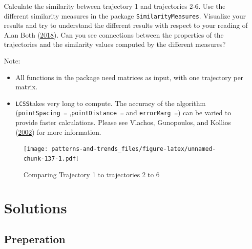 \documentclass[]{book}
\providecommand{\tightlist}{%
  \setlength{\itemsep}{0pt}\setlength{\parskip}{0pt}}
\begin{document}
Calculate the similarity between trajectory 1 and trajectories 2-6. Use
the different similarity measures in the package
\texttt{SimilarityMeasures}. Visualize your results and try to
understand the different results with respect to your reading of Alan
Both (\protect\hyperlink{ref-both2018}{2018}). Can you see connections
between the properties of the trajectories and the similarity values
computed by the different measures?

Note:

\begin{itemize}
\tightlist
\item
  All functions in the package need matrices as input, with one
  trajectory per matrix.
\item
  \texttt{LCSS}takes very long to compute. The accuracy of the algorithm
  (\texttt{pointSpacing\ =} ,\texttt{pointDistance\ =} and
  \texttt{errorMarg\ =}) can be varied to provide faster calculations.
  Please see Vlachos, Gunopoulos, and Kollios
  (\protect\hyperlink{ref-vlachos2002}{2002}) for more information.
\end{itemize}

\begin{figure}
\centering
\texttt{[image: patterns-and-trends\_files/figure-latex/unnamed-chunk-137-1.pdf]}
\caption{\label{fig:unnamed-chunk-137}Comparing Trajectory 1 to trajectories
2 to 6}
\end{figure}

\section{Solutions}\label{solutions-2}

\subsection{Preperation}\label{preperation-5}
\end{document}
